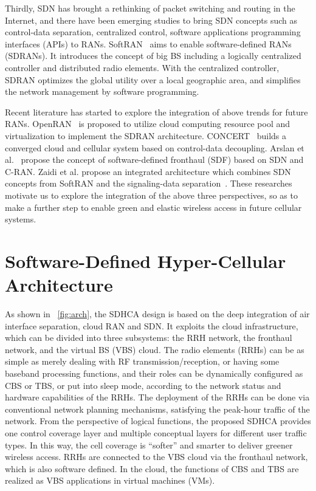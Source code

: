 \documentclass[12pt, draftclsnofoot,onecolumn]{IEEEtran}
\begin{document}
Thirdly, SDN has brought a rethinking of packet switching and routing in the Internet, and there have been emerging studies to
bring SDN concepts such as control-data separation, centralized control,
software applications programming interfaces (APIs) to RANs.
SoftRAN~\cite{gudipati2013softran} aims
to enable software-defined RANs (SDRANs). It introduces
the concept of big BS including a logically centralized controller
and distributed radio elements. With the centralized controller,
SDRAN optimizes the global utility over a local geographic area, and
simplifies the network management by software programming.

Recent literature has started to explore the integration of above trends for future RANs.
OpenRAN~\cite{yang2013openran} is proposed to utilize cloud computing resource pool and virtualization
to implement the SDRAN architecture.
CONCERT~\cite{liu2014concert} builds a converged cloud and cellular system based on control-data decoupling.
Arslan et al.~\cite{arslan2015software} propose the concept of
software-defined fronthaul (SDF) based on SDN and C-RAN.
Zaidi et al. propose an integrated architecture which combines SDN concepts
from SoftRAN and the signaling-data separation~\cite{zaidi2015future}.
These researches motivate us to explore the integration of the above three perspectives,
so as to make a further step to enable green and elastic wireless access in future
cellular systems.

\section{Software-Defined Hyper-Cellular Architecture}
\label{sec:SDHCA}

As shown in \figurename~\ref{fig:arch}, the SDHCA design is based on
the deep integration of air interface separation, cloud RAN and SDN. It exploits the cloud infrastructure, which can be
divided into three subsystems: the RRH network, the fronthaul network, and the
virtual BS (VBS) cloud. The radio elements (RRHs) can be as simple as merely dealing with RF transmission/reception, or having some baseband processing functions, and their roles can be dynamically
configured as CBS or TBS, or put into sleep mode, according to the network status and hardware capabilities of the RRHs. The deployment of the RRHs can be done via conventional network planning mechanisms, satisfying the peak-hour traffic of the network.
From the perspective of logical functions,
the proposed SDHCA provides one control coverage layer and
multiple conceptual layers for different user traffic types. In this way, the cell
coverage is ``softer'' and smarter to deliver greener wireless access.
RRHs are connected to the VBS cloud via the fronthaul network, which
is also software defined. In the cloud, the functions of CBS and TBS are realized as VBS applications in
virtual machines (VMs).
\end{document}
